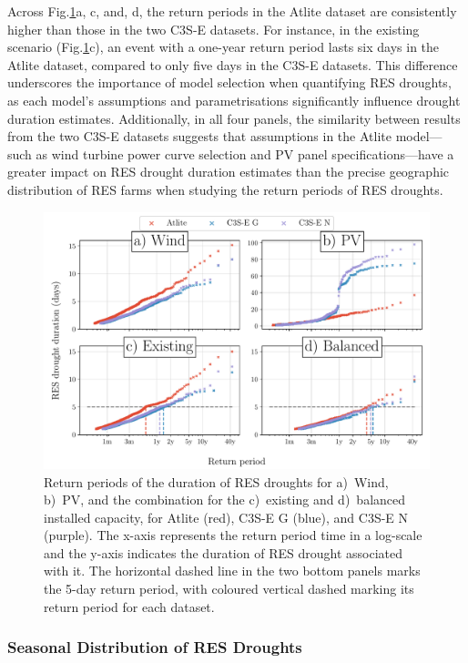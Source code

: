 \documentclass[a4paper, 11pt]{article}
\begin{document}
Across Fig.\ref{fig:return_periods}a, c, and, d, the return periods in the Atlite dataset are consistently higher than those in the two C3S-E datasets. For instance, in the existing scenario (Fig.\ref{fig:return_periods}c), an event with a one-year return period lasts six days in the Atlite dataset, compared to only five days in the C3S-E datasets. This difference underscores the importance of model selection when quantifying RES droughts, as each model’s assumptions and parametrisations significantly influence drought duration estimates. Additionally, in all four panels, the similarity between results from the two C3S-E datasets suggests that assumptions in the Atlite model—such as wind turbine power curve selection and PV panel specifications—have a greater impact on RES drought duration estimates than the precise geographic distribution of RES farms when studying the return periods of RES droughts.

\begin{figure}[!ht]
	\centering
	\includegraphics[width=\textwidth]{droughts_return_periods}
	\caption{Return periods of the duration of RES droughts for a)~Wind, b)~PV, and the combination for the c)~existing and d)~balanced installed capacity, for Atlite (red), C3S-E G (blue), and C3S-E N (purple). The x-axis represents the return period time in a log-scale and the y-axis indicates the duration of RES drought associated with it. The horizontal dashed line in the two bottom panels marks the 5-day return period, with coloured vertical dashed marking its return period for each dataset.}
	\label{fig:return_periods}
\end{figure}

\newpage
\subsubsection{Seasonal Distribution of RES Droughts}
\end{document}
